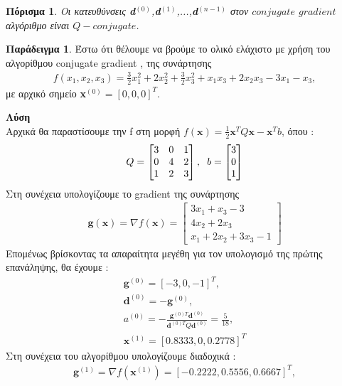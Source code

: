\documentclass[a4paper,12pt,twoside]{report}
\theoremstyle{plain}
\newtheorem{cor}{Πόρισμα}[section]
\theoremstyle{definition}
\newtheorem{exmp}{Παράδειγμα}[section] %
\theoremstyle{remark}
\begin{document}
\begin{cor}
Οι κατευθύνσεις \textbf{d}$^{(0)}$,\textbf{d}$^{(1)}$,...,\textbf{d}$^{(n-1)}$ στον $conjugate$ $gradient$ αλγόριθμο είναι $Q-conjugate$.
\end{cor}
\begin{exmp}
Έστω ότι θέλουμε να βρούμε το ολικό ελάχιστο με χρήση του αλγορίθμου conjugate gradient , της συνάρτησης 
\begin{align*}
f(x_1,x_2,x_3) = \frac{3}{2}x_1 ^2 + 2x_2 ^2 + \frac{3}{2}x_3 ^2 + x_1x_3+2x_2x_3-3x_1-x_3,
\end{align*}
με αρχικό σημείο \textbf{x}$^{(0)} = [0,0,0]^T$.

\textbf{Λύση}\\
Αρχικά θα παραστίσουμε την f στη μορφή $f(\textbf{x})=\frac{1}{2}\textbf{x}^TQ\textbf{x}-\textbf{x}^Tb$, όπου :
\begin{align*}
Q = \begin{bmatrix}
3 & 0 & 1\\
0 & 4 & 2\\
1 & 2 & 3
\end{bmatrix}, \hspace{0.2cm} b=\begin{bmatrix}
3\\
0\\
1
\end{bmatrix}
\end{align*}
Στη συνέχεια υπολογίζουμε το gradient της συνάρτησης
\begin{align*}
\textbf{g}(\textbf{x}) = \nabla f(\textbf{x}) = \begin{bmatrix}
3x_1 + x_3 - 3\\
4x_2 + 2x_3\\
x_1+2x_2+3x_3-1
\end{bmatrix}
\end{align*}
Επομένως βρίσκοντας τα απαραίτητα μεγέθη για τον υπολογισμό της πρώτης επανάληψης, θα έχουμε :
\begin{align*}
\textbf{g}^{(0)} = [-3, 0, -1]^T,\\
\textbf{d}^{(0)} = -\textbf{g}^{(0)},\\
a^{(0)} = -\frac{\textbf{g}^{(0)T}\textbf{d}^{(0)}}{\textbf{d}^{(0)T}Q\textbf{d}^{(0)}} = \frac{5}{18},\\
\textbf{x}^{(1)} = [0.8333, 0, 0.2778]^T
\end{align*}
Στη συνέχεια του αλγορίθμου υπολογίζουμε διαδοχικά :
\begin{align*}
\textbf{g}^{(1)} = \nabla f(\textbf{x}^{(1)}) = [-0.2222, 0.5556, 0.6667]^T,\\

\end{align*}
\end{exmp}
\end{document}
